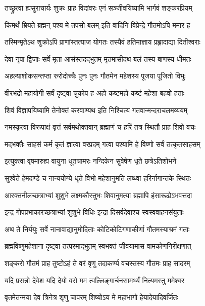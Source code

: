 \twolineshloka
{तच्छ्रुत्वा ह्यसुराचार्यः शुक्रः प्राह विदांवरः}
{एनं सञ्जीवयिष्यामि भार्गवं शङ्करप्रियम्}%

\twolineshloka
{किमर्थं म्रियते ब्रह्मन् पश्य मे तपसो बलम्}
{इति वादिनि विप्रेन्द्रे गौतमोऽपि ममार ह}%

\twolineshloka
{तस्मिन्मृतेऽथ शुक्रोऽपि प्राणांस्तत्याज योगतः}
{तस्यैवं हतिमाज्ञाय प्रह्लादाद्या दितीश्वराः}%

\twolineshloka
{देवा नृपा द्विजाः सर्वे मृता आसंस्तदद्भुतम्}
{मृतमासीदथ बलं तस्य बाणस्य धीमतः}%

\twolineshloka
{अहल्याशोकसन्तप्ता रुरोदोच्चैः पुनः पुनः}
{गौतमेन महेशस्य पूजया पूजितो विभुः}%

\twolineshloka
{वीरभद्रो महायोगी सर्वं दृष्ट्वा चुकोप ह}
{अहो कष्टमहो कष्टं महेशा बहवो हताः}%

\twolineshloka
{शिवं विज्ञापयिष्यामि तेनोक्तं करवाण्यथ}
{इति निश्चित्य गतवान्मन्दराचलमव्ययम्}%

\twolineshloka
{नमस्कृत्वा विरूपाक्षं वृत्तं सर्वमथोक्तवान्}
{ब्रह्माणं च हरिं तत्र स्थितौ प्राह शिवो वचः}%

\twolineshloka
{मद्भक्तैः साहसं कर्म कृतं ज्ञात्वा वरप्रदम्}
{गत्वा पश्यामि हे विष्णो सर्वं तत्कृतसाहसम्}%

\twolineshloka
{इत्युक्त्वा वृषमारुह्य वायुना धूतचामरः}
{नन्दिकेन सुवेषेण धृते छत्रेऽतिशोभने}%

\twolineshloka
{सुश्वेते हेमदण्डे च नान्ययोग्ये धृते विभो}
{महेशानुमतिं लब्ध्वा हरिर्नागान्तके स्थितः}%

\twolineshloka
{आरक्तनीलच्छत्राभ्यां शुशुभे लक्ष्मकौस्तुभः}
{शिवानुमत्या ब्रह्मापि हंसारूढोऽभवत्तदा}%

\twolineshloka
{इन्द्र गोपप्रभाकारच्छत्राभ्यां शुशुभे विधिः}
{इन्द्रा दिसर्वदेवाश्च स्वस्ववाहनसंयुताः}%

\twolineshloka
{अथ ते निर्ययुः सर्वे नानावाद्यानुमोदिताः}
{कोटिकोटिगणाकीर्णा गौतमस्याश्रमं गताः}%

\twolineshloka
{ब्रह्मविष्णुमहेशाना दृष्ट्वा तत्परमाद्भुतम्}
{स्वभक्तं जीवयामास वामकोणनिरीक्षणात्}%

\twolineshloka
{शङ्करो गौतमं प्राह तुष्टोऽहं ते वरं वृणु}
{तदाकर्ण्य वचस्तस्य गौतमः प्राह सादरम्}%

\twolineshloka
{यदि प्रसन्नो देवेश यदि देयो वरो मम}
{त्वल्लिङ्गार्चनसामर्थ्यं नित्यमस्तु ममेश्वर}%

\twolineshloka
{वृतमेतन्मया देव त्रिनेत्र शृणु चापरम्}
{शिष्योऽय मे महाभागो हेयादेयादिवर्जितः}%

